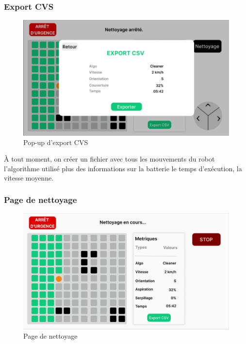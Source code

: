 \subsubsection{Export CVS}

\begin{figure}[H]
    \centering
    \includegraphics[scale=0.25]{data/IHM4.png}
    \caption{Pop-up d'export CVS}
    \label{fig:ihm_android_export}
\end{figure}

À tout moment, on créer un fichier avec tous les mouvements du robot l'algorithme utilisé plus des informations sur la batterie le temps d'exécution, la vitesse moyenne.

\subsubsection{Page de nettoyage}

\begin{figure}[H]
    \centering
    \includegraphics[scale=0.25]{data/IHM5.png}
    \caption{Page de nettoyage}
    \label{fig:ihm_android_cleaning}
\end{figure}

